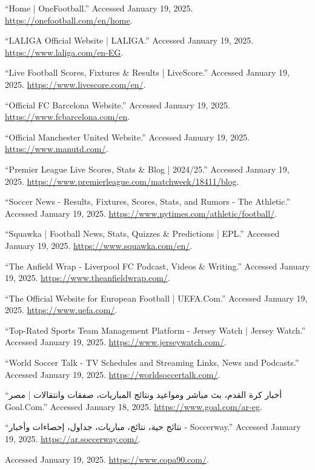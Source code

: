 \begin{thebibliography}{9}
“Home | OneFootball.” Accessed January 19, 2025. \url{https://onefootball.com/en/home}.

“LALIGA Official Website | LALIGA.” Accessed January 19, 2025. \url{https://www.laliga.com/en-EG}.

“Live Football Scores, Fixtures \& Results | LiveScore.” Accessed January 19, 2025. \url{https://www.livescore.com/en/}.

“Official FC Barcelona Website.” Accessed January 19, 2025. \url{https://www.fcbarcelona.com/en}.

“Official Manchester United Website.” Accessed January 19, 2025. \url{https://www.manutd.com/}.

“Premier League Live Scores, Stats \& Blog | 2024/25.” Accessed January 19, 2025. \url{https://www.premierleague.com/matchweek/18411/blog}.

“Soccer News - Results, Fixtures, Scores, Stats, and Rumors - The Athletic.” Accessed January 19, 2025. \url{https://www.nytimes.com/athletic/football/}.

“Squawka | Football News, Stats, Quizzes \& Predictions | EPL.” Accessed January 19, 2025. \url{https://www.squawka.com/en/}.

“The Anfield Wrap - Liverpool FC Podcast, Videos \& Writing.” Accessed January 19, 2025. \url{https://www.theanfieldwrap.com/}.

“The Official Website for European Football | UEFA.Com.” Accessed January 19, 2025. \url{https://www.uefa.com/}.

“Top-Rated Sports Team Management Platform - Jersey Watch | Jersey Watch.” Accessed January 19, 2025. \url{https://www.jerseywatch.com/}.

“World Soccer Talk - TV Schedules and Streaming Links, News and Podcasts.” Accessed January 19, 2025. \url{https://worldsoccertalk.com/}.

“أخبار كرة القدم، بث مباشر ومواعيد ونتائج المباريات، صفقات وانتقالات | مصر Goal.Com.” Accessed January 18, 2025. \url{https://www.goal.com/ar-eg}.

“نتائج حية، نتائج، مباريات، جداول، إحصاءات وأخبار - Soccerway.” Accessed January 19, 2025. \url{https://ar.soccerway.com/}.

Accessed January 19, 2025. \url{https://www.copa90.com/}.

\end{thebibliography}